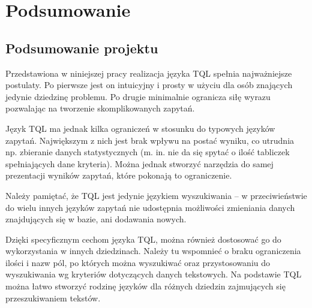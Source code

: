 \chapter*{Podsumowanie}
% 

\section*{Podsumowanie projektu}
Przedstawiona w niniejszej pracy realizacja języka TQL spełnia najważniejsze postulaty. 
Po pierwsze jest on intuicyjny i prosty w użyciu dla osób znających jedynie dziedzinę problemu.
Po drugie minimalnie ogranicza siłę wyrazu pozwalając na tworzenie skomplikowanych zapytań.

Język TQL ma jednak kilka ograniczeń w stosunku do typowych języków zapytań. 
Największym z nich jest brak wpływu na postać wyniku, co utrudnia np. zbieranie danych statystycznych 
(m. in. nie da się spytać o ilość tabliczek spełniających dane kryteria). 
Można jednak stworzyć narzędzia do samej prezentacji wyników zapytań, które pokonają to ograniczenie. 

Należy pamiętać, że TQL jest jedynie językiem wyszukiwania -- w przeciwieństwie do wielu innych języków zapytań
nie udostępnia możliwości zmieniania danych znajdujących się w bazie, ani dodawania nowych. 

Dzięki specyficznym cechom języka TQL, można również dostosować go do wykorzystania w innych dziedzinach. 
Należy tu wspomnieć o braku ograniczenia ilości i nazw pól, po których można wyszukiwać oraz przystosowaniu 
do wyszukiwania wg kryteriów dotyczących danych tekstowych. 
Na podstawie TQL można łatwo stworzyć rodzinę języków dla różnych dziedzin zajmujących się przeszukiwaniem tekstów.

